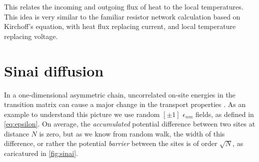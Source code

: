 This relates the incoming and outgoing flux of heat 
to the local temperatures. This idea is very similar
to the familiar resistor network calculation based on Kirchoff's equation, with 
heat flux replacing current, and local temperature replacing voltage. 
 

\begin{comment}
\section{Banded matrices spectrum}


For wide bandwidth and uncorrelated matrix elements, the high eigenvalues
should follow the Wigner semicircle law ($g(\lambda) = \frac{2}{\pi R^2}\sqrt{R^2-\lambda^2}$)
\cite{erdos_local_2012,fyodorov_scaling_1991,wigner_characteristic_1955}. However,
the low eigenvalues can still follow other rules, allowing for a transition
between diffusion and subdiffusion.
\end{comment}




\section{Sinai diffusion}\label{sec:sinai}


In a one-dimensional asymmetric chain, uncorrelated on-site
energies in the transition matrix
can cause a major change in the 
transport properties \cite{sinai_limiting_1983,bouchaud_anomalous_1990}.
As an example to understand this picture we use random $[\pm 1]$ $\epsilon_{nm}$ fields,
as defined in \autoref{eq:epsilon}. 
On average, the \emph{accumulated} potential difference 
between two sites at distance $N$ is zero, but as we know 
from random walk, the width of this difference, or rather 
the potential \emph{barrier} between the sites is of order $\sqrt{N}$, as 
caricatured in \autoref{fig:sinai}.


\begin{comment}
import numpy as np
rand_E = (np.random.rand_integers(1,size=100)*2-1).cumsum()
pairs = [ "({0},{1})".format(n,E) for n,E in enumerate(rand_E)]
print("{"+ "".join(pairs)+"};")
print("\n  min,max: {0:.2f},{1:.2f}".format(rand_E.min(), rand_E.max()))
\end{comment} 


